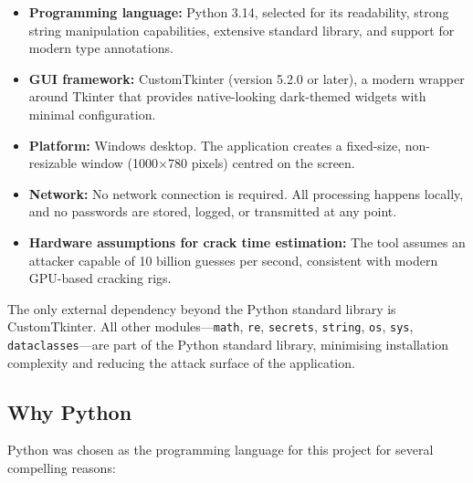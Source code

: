 \begin{itemize}
    \item \textbf{Programming language:} Python 3.14, selected for its readability, strong string manipulation capabilities, extensive standard library, and support for modern type annotations.
    \item \textbf{GUI framework:} CustomTkinter (version 5.2.0 or later), a modern wrapper around Tkinter that provides native-looking dark-themed widgets with minimal configuration.
    \item \textbf{Platform:} Windows desktop. The application creates a fixed-size, non-resizable window (1000$\times$780 pixels) centred on the screen.
    \item \textbf{Network:} No network connection is required. All processing happens locally, and no passwords are stored, logged, or transmitted at any point.
    \item \textbf{Hardware assumptions for crack time estimation:} The tool assumes an attacker capable of 10 billion guesses per second, consistent with modern GPU-based cracking rigs.
\end{itemize}

The only external dependency beyond the Python standard library is CustomTkinter. All other modules---\texttt{math}, \texttt{re}, \texttt{secrets}, \texttt{string}, \texttt{os}, \texttt{sys}, \texttt{dataclasses}---are part of the Python standard library, minimising installation complexity and reducing the attack surface of the application.

\subsection{Why Python}

Python was chosen as the programming language for this project for several compelling reasons:

